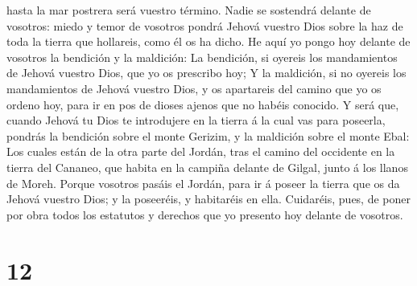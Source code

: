 hasta la mar postrera será vuestro término.  Nadie se
sostendrá delante de vosotros: miedo y temor de vosotros pondrá Jehová
vuestro Dios sobre la haz de toda la tierra que hollareis, como él os ha
dicho.  He aquí yo pongo hoy delante de vosotros la
bendición y la maldición:  La bendición, si oyereis los
mandamientos de Jehová vuestro Dios, que yo os prescribo hoy;
 Y la maldición, si no oyereis los mandamientos de Jehová
vuestro Dios, y os apartareis del camino que yo os ordeno hoy, para ir
en pos de dioses ajenos que no habéis conocido.  Y será
que, cuando Jehová tu Dios te introdujere en la tierra á la cual vas
para poseerla, pondrás la bendición sobre el monte Gerizim, y la
maldición sobre el monte Ebal:  Los cuales están de la otra
parte del Jordán, tras el camino del occidente en la tierra del Cananeo,
que habita en la campiña delante de Gilgal, junto á los llanos de Moreh.
 Porque vosotros pasáis el Jordán, para ir á poseer la
tierra que os da Jehová vuestro Dios; y la poseeréis, y habitaréis en
ella.  Cuidaréis, pues, de poner por obra todos los
estatutos y derechos que yo presento hoy delante de vosotros.

\hypertarget{section-11}{%
\section{12}\label{section-11}}

